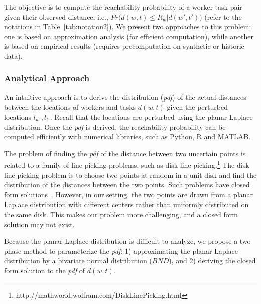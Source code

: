 \documentclass{USC-Thesis}
\numberwithin{equation}{chapter}
\begin{document}
The objective is to compute the reachability probability of a worker-task pair given their observed distance, i.e., $\mathit{Pr\big(d(w,t) \le R_w | d(w',t')\big)}$ (refer to the notations in Table~\ref{tab:notation2}). We present two approaches to this problem: one is based on approximation analysis (for efficient computation), while another is based on empirical results (requires precomputation on synthetic or historic data).

\subsubsection{Analytical Approach}
\label{sec:analytical}
An intuitive approach is to derive the distribution (\emph{pdf}) of the actual distances between the locations of workers and tasks $d(w,t)$ given the perturbed locations $l_{w'},l_{t'}$. Recall that the locations are perturbed using the planar Laplace distribution. Once the \emph{pdf} is derived, the reachability probability can be computed efficiently with numerical libraries, such as Python, R and MATLAB. 

The problem of finding the \emph{pdf} of the distance between two uncertain points is related to a family of line picking problems, such as disk line picking.\footnote{http://mathworld.wolfram.com/DiskLinePicking.html} The disk line picking problem is to choose two points at random in a unit disk and find the distribution of the distances between the two points. Such problems have closed form solutions~\cite{tu2002random}. However, in our setting, the two points are drawn from a planar Laplace distribution with different centers rather than uniformly distributed on the same disk. This makes our problem more challenging, and a closed form solution may not exist. 

Because the planar Laplace distribution is difficult to analyze, we propose a two-phase method to parameterize the \emph{pdf}: 1) approximating the planar Laplace distribution by a bivariate normal distribution ($\mathit{BND}$), and 2) deriving the closed form solution to the \emph{pdf} of $d(w,t)$.
\end{document}
